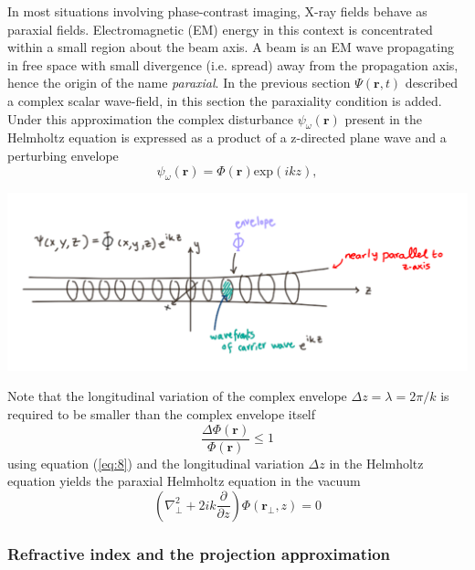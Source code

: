 \documentclass[10pt, a4paper, singlespacing]{report}
\newenvironment{Figure}
    {\par\medskip\noindent\minipage{\linewidth}}
    {\endminipage\par\medskip}
\begin{document}
In most situations involving phase-contrast imaging, X-ray fields behave as paraxial fields. Electromagnetic (EM) energy in this context is concentrated within a small region about the beam axis. A beam is an EM wave propagating in free space with small divergence (i.e. spread) away from the propagation axis, hence the origin of the name \textit{paraxial}.
In the previous section $\Psi(\mathbf{r},t)$ described a complex scalar wave-field, in this section the paraxiality condition is added.
Under this approximation the complex disturbance $\psi_{\omega}(\mathbf{r})$ present in the Helmholtz equation is expressed as a product of a z-directed plane wave and a perturbing envelope\cite{PagsTutes}\cite{CH49}
\begin{equation}\label{eq:7}
\psi_{\omega}(\mathbf{r}) = \Phi(\mathbf{r})\mathrm{exp}(ikz),
\end{equation}
\begin{Figure}
\centering
\includegraphics[width=0.6\linewidth]{paraxial_beam.pdf}\label{fig:1}
\end{Figure}
Note that the longitudinal variation of the complex envelope $\Delta z = \lambda = 2 \pi/k$ is required to be smaller than the complex envelope itself
\begin{equation}\label{eq:8}
\frac{\Delta \Phi(\mathbf{r})}{\Phi(\mathbf{r})} \leq 1
\end{equation}
using equation (\ref{eq:8}) and the longitudinal variation $\Delta z$  in the Helmholtz equation yields the paraxial Helmholtz equation in the vacuum
\begin{equation}\label{eq:9}
\left (\nabla_{\perp}^{2} + 2 i k \frac{\partial }{\partial z}\right ) \Phi(\mathbf{r}_{\perp}, z) = 0
\end{equation}

\subsubsection{Refractive index and the projection approximation}\label{PA}
\end{document}
